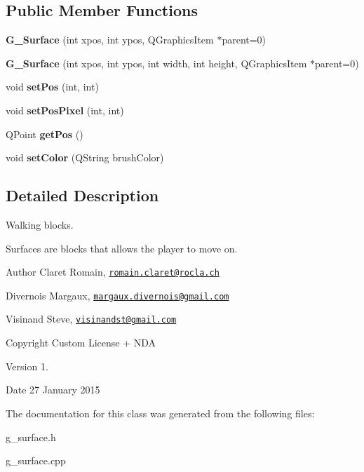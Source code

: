 \subsection*{Public Member Functions}
\begin{DoxyCompactItemize}
\item 
\hypertarget{class_g___surface_afb71c0c8f19e917e3de6b1547ee7ec0b}{}{\bfseries G\+\_\+\+Surface} (int xpos, int ypos, Q\+Graphics\+Item $\ast$parent=0)\label{class_g___surface_afb71c0c8f19e917e3de6b1547ee7ec0b}

\item 
\hypertarget{class_g___surface_ae7d55b80e9b5f1ac565fca487900993c}{}{\bfseries G\+\_\+\+Surface} (int xpos, int ypos, int width, int height, Q\+Graphics\+Item $\ast$parent=0)\label{class_g___surface_ae7d55b80e9b5f1ac565fca487900993c}

\item 
\hypertarget{class_g___surface_a4b7de535d01d281cbe7d8416efe69399}{}void {\bfseries set\+Pos} (int, int)\label{class_g___surface_a4b7de535d01d281cbe7d8416efe69399}

\item 
\hypertarget{class_g___surface_a8c77cd503984e3e07de7703895541597}{}void {\bfseries set\+Pos\+Pixel} (int, int)\label{class_g___surface_a8c77cd503984e3e07de7703895541597}

\item 
\hypertarget{class_g___surface_a1aae4cce58f1381631ac5735e10b85b5}{}Q\+Point {\bfseries get\+Pos} ()\label{class_g___surface_a1aae4cce58f1381631ac5735e10b85b5}

\item 
\hypertarget{class_g___surface_a44703a4951f6948fa890be9b7374c71e}{}void {\bfseries set\+Color} (Q\+String brush\+Color)\label{class_g___surface_a44703a4951f6948fa890be9b7374c71e}

\end{DoxyCompactItemize}


\subsection{Detailed Description}
Walking blocks. 

Surfaces are blocks that allows the player to move on. \begin{DoxyAuthor}{Author}
Claret Romain, \href{mailto:romain.claret@rocla.ch}{\tt romain.\+claret@rocla.\+ch} 

Divernois Margaux, \href{mailto:margaux.divernois@gmail.com}{\tt margaux.\+divernois@gmail.\+com} 

Visinand Steve, \href{mailto:visinandst@gmail.com}{\tt visinandst@gmail.\+com} 
\end{DoxyAuthor}
\begin{DoxyCopyright}{Copyright}
Custom License + N\+D\+A 
\end{DoxyCopyright}
\begin{DoxyVersion}{Version}
1. 
\end{DoxyVersion}
\begin{DoxyDate}{Date}
27 January 2015 
\end{DoxyDate}


The documentation for this class was generated from the following files\+:\begin{DoxyCompactItemize}
\item 
g\+\_\+surface.\+h\item 
g\+\_\+surface.\+cpp\end{DoxyCompactItemize}
